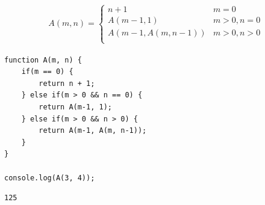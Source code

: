 
\begin{align}\nonumber
	A(m, n) =
	\begin{cases}
		n + 1             & m = 0        \\
		A(m-1, 1)         & m > 0, n = 0 \\
		A(m-1, A(m, n-1)) & m > 0, n > 0 \\
	\end{cases}
\end{align}

\begin{lstlisting}[style=htmlcssjs]
function A(m, n) {
    if(m == 0) {
        return n + 1;
    } else if(m > 0 && n == 0) {
        return A(m-1, 1);
    } else if(m > 0 && n > 0) {
        return A(m-1, A(m, n-1));
    }
}

console.log(A(3, 4));
\end{lstlisting}

\begin{tcolorbox}
	\begin{verbatim}
125
	\end{verbatim}
\end{tcolorbox}

